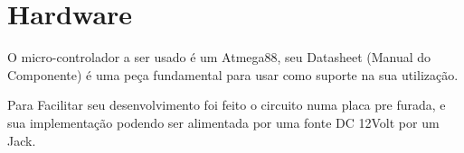 \documentclass[titlepage, a4paper, 10pt, reqno, openany]{report}
\begin{document}
\section{Hardware}
O micro-controlador a ser usado \'{e} um Atmega88, seu Datasheet (Manual do Componente) \'{e} uma pe\c{c}a fundamental para usar como suporte na sua utiliza\c{c}\~{a}o. \\

Para Facilitar seu desenvolvimento foi feito o circuito numa placa pre furada, e sua implementa\c{c}\~{a}o podendo ser alimentada por uma fonte DC 12Volt por um Jack.
\end{document}
